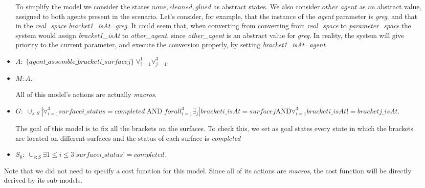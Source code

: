 \begin{itemize}
		To simplify the model we consider the states $none,cleaned,glued$ as abstract states. We also consider $other\_agent$ as an abstract value, assigned to both agents present in the scenario. Let's consider, for example, that the instance of the \textit{agent} parameter is \textit{greg}, and that in the \textit{real\_space} \textit{bracket1\_isAt=greg}. It could seem that, when converting from converting from \textit{real\_space} to \textit{parameter\_space} the system would assign \textit{bracket1\_isAt} to \textit{other\_agent}, since \textit{other\_agent} is an abstract value for \textit{greg}. In reality, the system will give priority to the current parameter, and execute the conversion properly, by setting \textit{bracket1\_isAt=agent}. 
	\item $A:\;\{agent\_assemble\_bracketi\_surfacej\}\;\forall_{i=1}^1 \forall_{j=1}^3$.
	\item $M: A$.

	All of this model's actions are actually \textit{macros}.
	\item $G:\; \cup_{s:S} | \forall_{i=1}^3 surfacei\_status=completed\;\text{AND}\;forall_{i=1}^3\exists_{j}|bracketi\_isAt=surfacej \text{AND} \forall_{i=1}^3 bracketi\_isAt!=bracketj\_isAt.$

	The goal of this model is to fix all the brackets on the surfaces. To check this, we set as goal states every state in which the brackets are located on different surfaces and the status of each surface is \textit{completed}
	\item $S_0:\; \cup_{s:S} \exists{1\leq i \leq 3} | surfacei\_status!=completed$.

\end{itemize}

Note that we did not need to specify a cost function for this model. Since all of its actions are \textit{macros}, the cost function will be directly derived by its sub-models.

